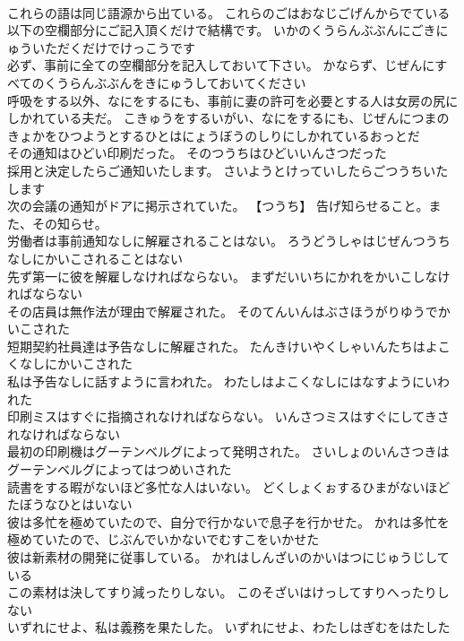 \documentclass[8pt]{extreport}
\begin{document}
\begin{CJK}{UTF8}{min}
\\	これらの語は同じ語源から出ている。	これらのごはおなじごげんからでている 
\\	以下の空欄部分にご記入頂くだけで結構です。	いかのくうらんぶぶんにごきにゅういただくだけでけっこうです 
\\	必ず、事前に全ての空欄部分を記入しておいて下さい。	かならず、じぜんにすべてのくうらんぶぶんをきにゅうしておいてください 
\\	呼吸をする以外、なにをするにも、事前に妻の許可を必要とする人は女房の尻にしかれている夫だ。	こきゅうをするいがい、なにをするにも、じぜんにつまのきょかをひつようとするひとはにょうぼうのしりにしかれているおっとだ 
\\	その通知はひどい印刷だった。	そのつうちはひどいいんさつだった 
\\	採用と決定したらご通知いたします。	さいようとけっていしたらごつうちいたします 
\\	次の会議の通知がドアに掲示されていた。	【つうち】 告げ知らせること。また、その知らせ。
\\	労働者は事前通知なしに解雇されることはない。	ろうどうしゃはじぜんつうちなしにかいこされることはない 
\\	先ず第一に彼を解雇しなければならない。	まずだいいちにかれをかいこしなければならない 
\\	その店員は無作法が理由で解雇された。	そのてんいんはぶさほうがりゆうでかいこされた 
\\	短期契約社員達は予告なしに解雇された。	たんきけいやくしゃいんたちはよこくなしにかいこされた 
\\	私は予告なしに話すように言われた。	わたしはよこくなしにはなすようにいわれた 
\\	印刷ミスはすぐに指摘されなければならない。	いんさつミスはすぐにしてきされなければならない 
\\	最初の印刷機はグーテンベルグによって発明された。	さいしょのいんさつきはグーテンベルグによってはつめいされた 
\\	読書をする暇がないほど多忙な人はいない。	どくしょくぉするひまがないほどたぼうなひとはいない 
\\	彼は多忙を極めていたので、自分で行かないで息子を行かせた。	かれは多忙を極めていたので、じぶんでいかないでむすこをいかせた 
\\	彼は新素材の開発に従事している。	かれはしんざいのかいはつにじゅうじしている 
\\	この素材は決してすり減ったりしない。	このそざいはけっしてすりへったりしない 
\\	いずれにせよ、私は義務を果たした。	いずれにせよ、わたしはぎむをはたした 

\end{CJK}
\end{document}
